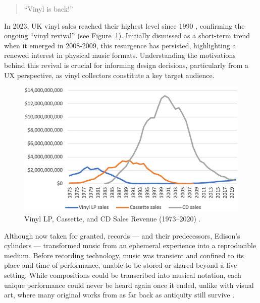             \begin{quote}
                ``Vinyl is back!'' \cite{bechhofervttspec}
            \end{quote}
            
            In 2023, UK vinyl sales reached their highest level since 1990 \cite{geraghty2023uk_vinyl_sales}, confirming the ongoing ``vinyl revival'' \cite{vinylRevival} (see Figure~\ref{fig:vinyl_sales}). Initially dismissed as a short-term trend when it emerged in 2008-2009, this resurgence has persisted, highlighting a renewed interest in physical music formats. Understanding the motivations behind this revival is crucial for informing design decisions, particularly from a UX perspective, as vinyl collectors constitute a key target audience.
            
            \begin{figure}[htbp]
                \centering
                \includegraphics[width=\linewidth]{images/vinyl_sales_2023.png}
                \caption{Vinyl LP, Cassette, and CD Sales Revenue (1973–2020) \cite{vinylRevival}.}
                \label{fig:vinyl_sales}
            \end{figure}
    
    
            Although now taken for granted, records — and their predecessors, Edison's cylinders — transformed music from an ephemeral experience into a reproducible medium. Before recording technology, music was transient and confined to its place and time of performance, unable to be stored or shared beyond a live setting. While compositions could be transcribed into musical notation, each unique performance could never be heard again once it ended, unlike with visual art, where many original works from as far back as antiquity still survive \cite{jdbond}.
    
